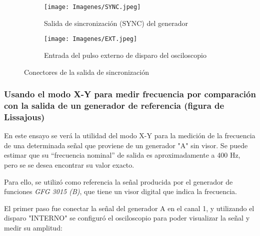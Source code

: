 \begin{figure}[H]
        \begin{subfigure}[b]{0.5\textwidth}
        \centering  
        \texttt{[image: Imagenes/SYNC.jpeg]}
        \caption{Salida de sincronización (SYNC) del generador}
        \label{fig:SYNC}
    \end{subfigure}
    \hfill
    \begin{subfigure}[b]{0.49\textwidth}
        \centering
        \texttt{[image: Imagenes/EXT.jpeg]}
        \caption{Entrada del pulso externo de disparo del osciloscopio}
        \label{fig:EXT}
    \end{subfigure}
    \caption{Conectores de la salida de sincronización}
\end{figure}


\vspace{0.5cm}
\subsubsection{Usando el modo X-Y para medir frecuencia por comparación con la salida de un
generador de referencia (figura de Lissajous)}

En este ensayo se verá la utilidad del modo X-Y para la medición de la frecuencia de una
determinada señal que proviene de un generador "A" sin visor. Se puede estimar que su “frecuencia nominal” de salida es aproximadamente a 400 Hz, pero se se desea encontrar su valor exacto.

Para ello, se utilizó como referencia la señal producida por el generador de funciones \textit{GFG 3015 (B)}, que tiene un visor digital que indica la frecuencia.

El primer paso fue conectar la señal del generador A en el canal 1, y utilizando el disparo "INTERNO" se configuró el osciloscopio para poder visualizar la señal y medir su amplitud:

\begin{table}[H]
    \centering
        \def\tablename{Tabla} 
        \caption{Cuadro de Controles}
        \label{tab:cont6}
\end{table}

